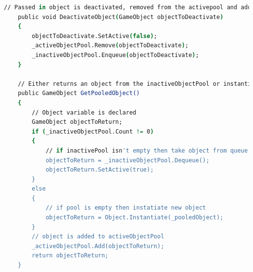 \begin{lstlisting}[language=csh, caption = Object pool activate and deactivate, label={lst:ObjectPoolActivateDeactivate}]
// Passed in object is deactivated, removed from the activepool and added to inactivepool
    public void DeactivateObject(GameObject objectToDeactivate)
    {
        objectToDeactivate.SetActive(false);
        _activeObjectPool.Remove(objectToDeactivate);
        _inactiveObjectPool.Enqueue(objectToDeactivate);
    }

    // Either returns an object from the inactiveObjectPool or instantiates a new object if the inactiveObjectPool is empty
    public GameObject GetPooledObject()
    {
        // Object variable is declared
        GameObject objectToReturn;
        if (_inactiveObjectPool.Count != 0)
        {
            // if inactivePool isn't empty then take object from queue
            objectToReturn = _inactiveObjectPool.Dequeue();
            objectToReturn.SetActive(true);
        }
        else
        {
            // if pool is empty then instatiate new object
            objectToReturn = Object.Instantiate(_pooledObject);
        }
        // object is added to activeObjectPool
        _activeObjectPool.Add(objectToReturn);
        return objectToReturn;
    }
\end{lstlisting}
